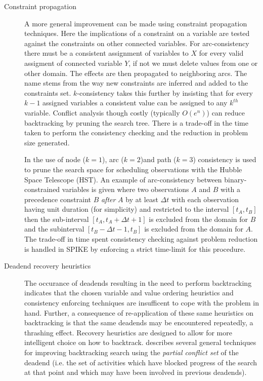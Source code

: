\begin{description}
\item[Constraint propagation]
A more general improvement can be made using constraint propagation techniques. Here the implications of a constraint on a variable are tested against the constraints on other connected variables. For arc-consistency there must be a consistent assignment of variables to $X$ for every valid assigment of connected variable $Y$, if not we must delete values from one or other domain. The effects are then propagated to neighboring arcs. The name stems from the way new constraints are inferred and added to the constraints set. $k$-consistency takes this further by insisting that for every $k-1$ assigned variables a consistent value can be assigned to any $k^{th}$ variable. Conflict analysis though costly (typically $O(e^n)$) \citep{bitner75backtrack} can reduce backtracking by pruning the search tree. There is a trade-off in the time taken to perform the consistency checking and the reduction in problem size generated.

 In \citep{johnston94spike} the use of node ($k=1$), arc ($k=2$)and path ($k=3$) consistency is used to prune the search space for scheduling observations with the Hubble Space Telescope (HST). An example of arc-consistency between binary-constrained variables is given where two observations $A$ and $B$ with a precedence constraint $B$ \emph{after} $A$ by at least $\Delta t$ with each observation having unit duration (for simplicity) and restricted to the interval $[t_A,t_B]$ then the sub-interval $[t_A,t_A+ \Delta t+1]$ is excluded from the domain for $B$ and the subinterval $[t_B-\Delta t-1,t_B]$ is excluded from the domain for $A$. The trade-off in time spent consistency checking against problem reduction is handled in SPIKE by enforcing a strict time-limit for this procedure.

\item[Deadend recovery heuristics] 
The occurance of deadends resulting in the need to perform backtracking indicates that the chosen variable and value ordering heuristics and consistency enforcing techniques are insufficent to cope with the problem in hand. Further, a consequence of re-application of these same heuristics on backtracking is that the same deadends may be encountered repeatedly, a thrashing effect. Recovery heuristics are designed to allow for more intelligent choice on how to backtrack. \citet{sadeh94backtracking} describes several general techniques for improving backtracking search using the \emph{partial conflict set} of the deadend (i.e. the set of activities which have blocked progress of the search at that point and which may have been involved in previous deadends).


\end{description}
